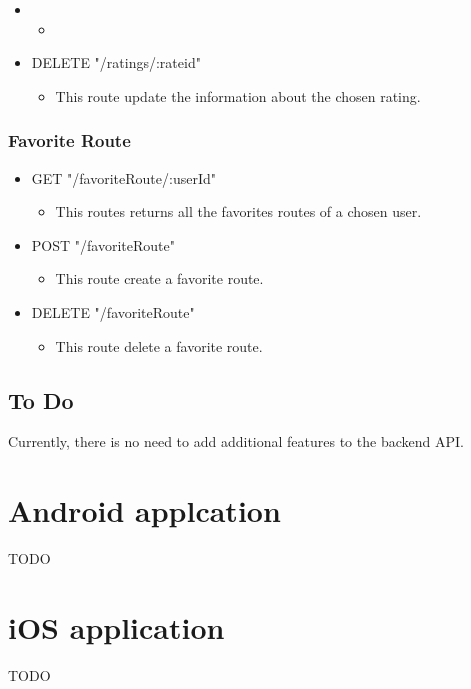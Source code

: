 \begin{itemize}
	\item 
	\begin{itemize}
		\item 
	\end{itemize}
\end{itemize}

\begin{itemize}
	\item DELETE "/ratings/:rateid"
	\begin{itemize}
		\item This route update the information about the chosen rating.
	\end{itemize}
\end{itemize}

\subsection{Favorite Route}
\begin{itemize}
	\item GET "/favoriteRoute/:userId"
	\begin{itemize}
		\item This routes returns all the favorites routes of a chosen user.
	\end{itemize}
\end{itemize}

\begin{itemize}
	\item POST "/favoriteRoute"
	\begin{itemize}
		\item This route create a favorite route.
	\end{itemize}
\end{itemize}

\begin{itemize}
	\item DELETE "/favoriteRoute"
	\begin{itemize}
		\item This route delete a favorite route.
	\end{itemize}
\end{itemize}

\section{To Do}

Currently, there is no need to add additional features to the backend API.

\chapter{Android applcation}

TODO

\chapter{iOS application}

TODO